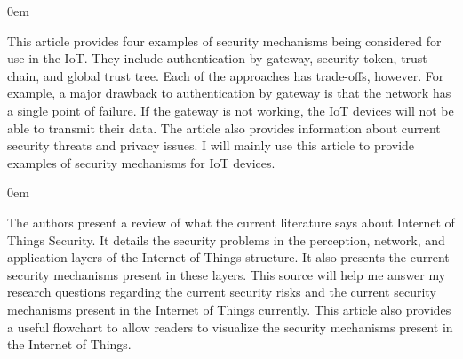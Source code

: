 \documentclass{article}
\newenvironment{annotation}{\begin{addmargin}[2.5em]{0em} \begin{flushleft}}{\end{flushleft} \end{addmargin}}
\begin{document}
\begin{annotation}
This article provides four examples of security mechanisms being considered for use in the IoT. They include authentication by gateway, security token, trust chain, and global trust tree. Each of the 
approaches has trade-offs, however.
For example, a major drawback to authentication by gateway is that the network has a single point of failure. If the gateway is not working, the IoT devices will not be able to transmit their data.
 The article also provides information about current security threats and privacy issues. I will mainly use this article to provide examples of security mechanisms for
IoT devices. 
\end{annotation}

\begin{annotation}
The authors present a review of what the current literature says about Internet of Things Security. 
It details the security problems in the perception, network, and application layers of the Internet of Things structure. 
It also presents the current security mechanisms present in these layers. 
This source will help me answer my research questions regarding the current security risks and the current security mechanisms present in the Internet of Things currently.
This article also provides a useful flowchart to allow readers to visualize the security mechanisms present in the Internet of Things.  
\end{annotation}
\end{document}
